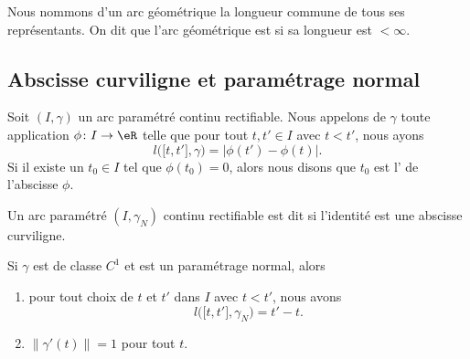 \begin{definition}
	Nous nommons  d'un arc géométrique la longueur commune de tous ses représentants. On dit que l'arc géométrique est  si sa longueur est \( <\infty\).
\end{definition}

\subsection{Abscisse curviligne et paramétrage normal}     \label{SubSecAbsCurv}

\begin{definition}
	Soit \( (I,\gamma)\) un arc paramétré continu rectifiable. Nous appelons  de \( \gamma\) toute application \( \phi\colon I\to \eR\) telle que pour tout \( t,t'\in I\) avec \( t<t'\), nous ayons
	\begin{equation}
		l\big( \mathopen[ t,t'  \mathclose],\gamma\big) = \big|  \phi(t')-\phi(t) \big|.
	\end{equation}
	Si il existe un \( t_0\in I\) tel que \( \phi(t_0)=0\), alors nous disons que \( t_0\) est l' de l'abscisse \( \phi\).
\end{definition}

\begin{definition}      \label{DEFooJJQFooEITCvG}
	Un arc paramétré \( (I,\gamma_N)\) continu rectifiable est dit  si l'identité est une abscisse curviligne.
\end{definition}

%
%

\begin{lemma}       \label{LEMooLADUooBlHjuT}
	Si \( \gamma\) est de classe \( C^1\) et est un paramétrage normal, alors
	\begin{enumerate}
		\item
		      pour tout choix de \( t\) et \( t'\) dans \( I\) avec \( t<t'\), nous avons
		      \begin{equation}
			      l\big( \mathopen[ t , t' \mathclose],\gamma_N \big)=t'-t.
		      \end{equation}
		\item
		      \( \| \gamma'(t) \|=1\) pour tout \( t\).
	\end{enumerate}
\end{lemma}

